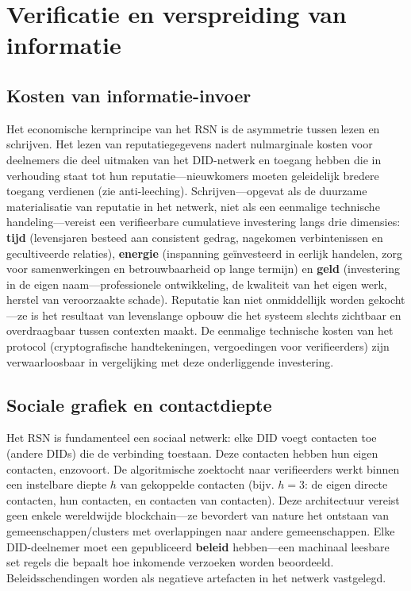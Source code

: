 \documentclass[11pt,a4paper,twocolumn]{article}
\begin{document}
\section{Verificatie en verspreiding van informatie}

\subsection{Kosten van informatie-invoer}

Het economische kernprincipe van het RSN is de asymmetrie tussen lezen en schrijven. Het lezen van reputatiegegevens nadert nulmarginale kosten voor deelnemers die deel uitmaken van het DID-netwerk en toegang hebben die in verhouding staat tot hun reputatie---nieuwkomers moeten geleidelijk bredere toegang verdienen (zie anti-leeching). Schrijven---opgevat als de duurzame materialisatie van reputatie in het netwerk, niet als een eenmalige technische handeling---vereist een verifieerbare cumulatieve investering langs drie dimensies: \textbf{tijd} (levensjaren besteed aan consistent gedrag, nagekomen verbintenissen en gecultiveerde relaties), \textbf{energie} (inspanning geïnvesteerd in eerlijk handelen, zorg voor samenwerkingen en betrouwbaarheid op lange termijn) en \textbf{geld} (investering in de eigen naam---professionele ontwikkeling, de kwaliteit van het eigen werk, herstel van veroorzaakte schade). Reputatie kan niet onmiddellijk worden gekocht---ze is het resultaat van levenslange opbouw die het systeem slechts zichtbaar en overdraagbaar tussen contexten maakt. De eenmalige technische kosten van het protocol (cryptografische handtekeningen, vergoedingen voor verifieerders) zijn verwaarloosbaar in vergelijking met deze onderliggende investering.

\subsection{Sociale grafiek en contactdiepte}

Het RSN is fundamenteel een sociaal netwerk: elke DID voegt contacten toe (andere DIDs) die de verbinding toestaan. Deze contacten hebben hun eigen contacten, enzovoort. De algoritmische zoektocht naar verifieerders werkt binnen een instelbare diepte $h$ van gekoppelde contacten (bijv. $h=3$: de eigen directe contacten, hun contacten, en contacten van contacten). Deze architectuur vereist geen enkele wereldwijde blockchain---ze bevordert van nature het ontstaan van gemeenschappen/clusters met overlappingen naar andere gemeenschappen. Elke DID-deelnemer moet een gepubliceerd \textbf{beleid} hebben---een machinaal leesbare set regels die bepaalt hoe inkomende verzoeken worden beoordeeld. Beleidsschendingen worden als negatieve artefacten in het netwerk vastgelegd.
\end{document}

